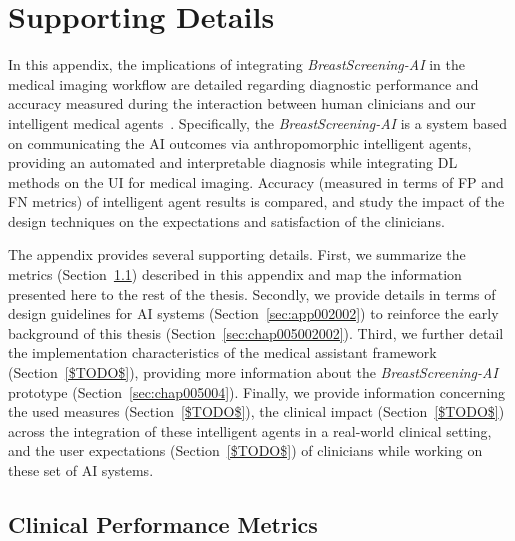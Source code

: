 \chapter{Supporting Details}
\label{chap:app002}

In this appendix, the implications of integrating {\it BreastScreening-AI} in the medical imaging workflow are detailed regarding diagnostic performance and accuracy measured during the interaction between human clinicians and our intelligent medical agents~\cite{CALISTO2022102285}.
Specifically, the {\it BreastScreening-AI} is a system based on communicating the \ac{AI} outcomes via anthropomorphic intelligent agents, providing an automated and interpretable diagnosis while integrating \ac{DL} methods on the \ac{UI} for medical imaging.
Accuracy (measured in terms of \ac{FP} and \ac{FN} metrics) of intelligent agent results is compared, and study the impact of the design techniques on the expectations and satisfaction of the clinicians.

The appendix provides several supporting details.
First, we summarize the metrics (Section~\ref{sec:app002001}) described in this appendix and map the information presented here to the rest of the thesis.
Secondly, we provide details in terms of design guidelines for \ac{AI} systems (Section~\ref{sec:app002002}) to reinforce the early background of this thesis (Section~\ref{sec:chap005002002}).
Third, we further detail the implementation characteristics of the medical assistant framework (Section~\ref{$TODO$}), providing more information about the {\it BreastScreening-AI} prototype (Section~\ref{sec:chap005004}).
Finally, we provide information concerning the used measures (Section~\ref{$TODO$}), the clinical impact (Section~\ref{$TODO$}) across the integration of these intelligent agents in a real-world clinical setting, and the user expectations (Section~\ref{$TODO$}) of clinicians while working on these set of \ac{AI} systems.

\section{Clinical Performance Metrics}
\label{sec:app002001}

